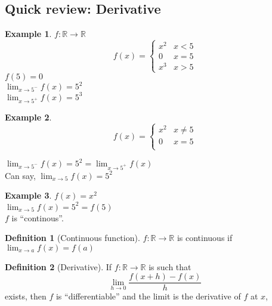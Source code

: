\documentclass[twocolumn,20pt,fleqn]{extarticle}
\theoremstyle{plain}
\theoremstyle{definition}
\newtheorem*{definition}{Definition}
\newtheorem*{example}{Example}
\theoremstyle{remark}
\begin{document}
\subsection{Quick review: Derivative}
\begin{example}
  $f : \mathbb{R}\to \mathbb{R}$
  \[f(x) =
      \begin{cases}
        x^2 & x < 5\\
        0 & x = 5\\
        x^3 & x > 5
      \end{cases}
      \]
      $f(5)=0$\\
$\displaystyle\lim_{x \to 5^-} f(x)  = 5^2$\\
$\displaystyle\lim_{x \to 5^+} f(x)  = 5^3$
\end{example}


\begin{example}
  \[f(x) =
      \begin{cases}
        x^2 & x  \neq  5\\
        0 & x = 5\\
        
      \end{cases}
      \]
      
      


$\displaystyle\lim_{x \to 5^-} f(x) = 5^2  = \displaystyle\lim_{x \to 5^+} f(x)$\\
Can say, $\displaystyle\lim_{x \to 5} f(x) = 5^2$
\end{example}

\newpage
\begin{example}
$f(x) = x^2$\\
$\displaystyle\lim_{x \to 5} f(x) = 5^2 = f(5)$\\
$f$ is ``continous''.
\end{example}

\begin{definition}[Continuous function]
$f : \mathbb{R} \to \mathbb{R}$ is continuous if $\displaystyle\lim_{x \to a} f(x) = f(a)$
\end{definition}

\begin{definition}[Derivative]
  If $f : \mathbb{R}\to \mathbb{R}$ is such that
  \[\displaystyle\lim_{h\to 0}\frac{f(x+h) - f(x)}{h}\] exists, then $f$ is ``differentiable'' and the limit is the derivative of $f$ at $x$, \end{definition}


\clearpage
\end{document}
